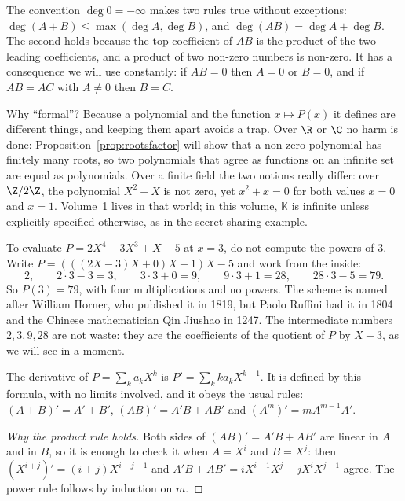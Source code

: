 The convention $\deg0=-\infty$ makes two rules true without exceptions: $\deg(A+B)\le\max(\deg A,\deg B)$, and $\deg(AB)=\deg A+\deg B$. The second
holds because the top coefficient of $AB$ is the product of the two leading coefficients, and a product of two non-zero numbers is non-zero. It has a
consequence we will use constantly: if $AB=0$ then $A=0$ or $B=0$, and if $AB=AC$ with $A\ne0$ then $B=C$.

Why ``formal''? Because a polynomial and the function $x\mapsto P(x)$ it defines are different things, and keeping them apart avoids a trap. Over
$\R$ or $\C$ no harm is done: Proposition~\ref{prop:rootsfactor} will show that a non-zero polynomial has finitely many roots, so two polynomials
that agree as functions on an infinite set are equal as polynomials. Over a finite field the two notions really differ: over $\Z/2\Z$, the polynomial
$X^2+X$ is not zero, yet $x^2+x=0$ for both values $x=0$ and $x=1$. Volume~1 lives in that world; in this volume, $\mathbb K$ is infinite unless explicitly specified otherwise, as in the secret-sharing example.

\begin{examplex}
To evaluate $P=2X^4-3X^3+X-5$ at $x=3$, do not compute the powers of $3$. Write $P=(((2X-3)X+0)X+1)X-5$ and work from the inside:
\[
2,\qquad 2\cdot3-3=3,\qquad 3\cdot3+0=9,\qquad 9\cdot3+1=28,\qquad 28\cdot3-5=79.
\]
So $P(3)=79$, with four multiplications and no powers. The scheme is named after William Horner, who published it in 1819, but Paolo Ruffini had
it in 1804 and the Chinese mathematician Qin Jiushao in 1247. The intermediate numbers $2,3,9,28$ are not waste: they are the coefficients of the
quotient of $P$ by $X-3$, as we will see in a moment.
\end{examplex}

\begin{definitionx}
The derivative of $P=\sum_ka_kX^k$ is $P'=\sum_kka_kX^{k-1}$. It is defined by this formula, with no limits involved, and it obeys the usual rules:
$(A+B)'=A'+B'$, $(AB)'=A'B+AB'$ and $(A^m)'=mA^{m-1}A'$.
\end{definitionx}
\begin{proof}[Why the product rule holds]
Both sides of $(AB)'=A'B+AB'$ are linear in $A$ and in $B$, so it is enough to check it when $A=X^i$ and $B=X^j$: then $(X^{i+j})'=(i+j)X^{i+j-1}$
and $A'B+AB'=iX^{i-1}X^j+jX^iX^{j-1}$ agree. The power rule follows by induction on $m$.
\end{proof}

